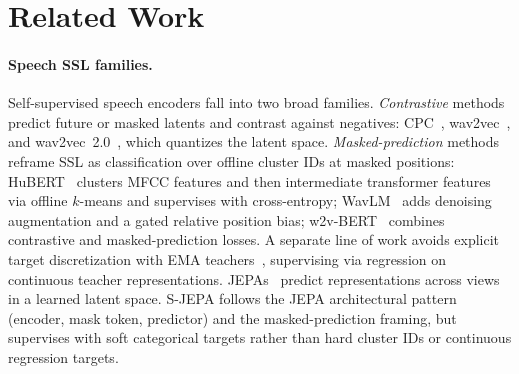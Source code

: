\documentclass[9pt,twocolumn]{article}
\theoremstyle{plain}
\theoremstyle{definition}
\theoremstyle{remark}
\begin{document}
\section{Related Work}
\label{sec:related}




\paragraph{Speech SSL families.} Self-supervised speech encoders fall into two broad families. \emph{Contrastive} methods predict future or masked latents and contrast against negatives: CPC~\citep{oord2018cpc}, wav2vec~\citep{schneider2019wav2vec}, and wav2vec~2.0~\citep{baevski2020wav2vec}, which quantizes the latent space. \emph{Masked-prediction} methods reframe SSL as classification over offline cluster IDs at masked positions: HuBERT~\citep{hsu2021hubert} clusters MFCC features and then intermediate transformer features via offline $k$-means and supervises with cross-entropy; WavLM~\citep{chen2022wavlm} adds denoising augmentation and a gated relative position bias; w2v-BERT~\citep{chung2021w2vbert} combines contrastive and masked-prediction losses. A separate line of work avoids explicit target discretization with EMA teachers~\citep{grill2020byol,caron2021dino,baevski2022data2vec}, supervising via regression on continuous teacher representations. JEPAs~\citep{lecun2022jepa,assran2023ijepa,fang2024ajepa} predict representations across views in a learned latent space. S-JEPA follows the JEPA architectural pattern (encoder, mask token, predictor) and the masked-prediction framing, but supervises with soft categorical targets rather than hard cluster IDs or continuous regression targets.
\end{document}
